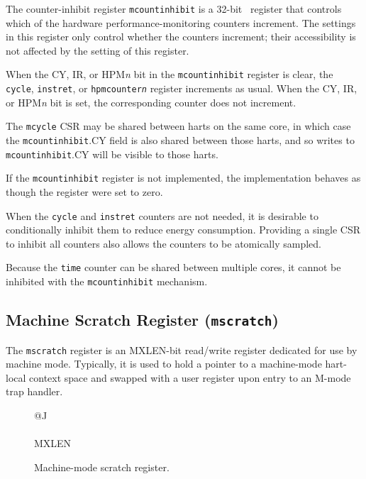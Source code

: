 The counter-inhibit register {\tt mcountinhibit} is a 32-bit \warl\ register
that controls which of the hardware performance-monitoring counters increment.
The settings in this register only control whether the counters increment;
their accessibility is not affected by the setting of this register.

When the CY, IR, or HPM{\em n} bit in the {\tt mcountinhibit} register is
clear, the {\tt cycle}, {\tt instret}, or {\tt hpmcounter{\em n}} register
increments as usual.  When the CY, IR, or HPM{\em n} bit is set, the
corresponding counter does not increment.

The {\tt mcycle} CSR may be shared between harts on the same core, in which
case the {\tt mcountinhibit}.CY field is also shared between those harts,
and so writes to {\tt mcountinhibit}.CY will be visible to those harts.

If the {\tt mcountinhibit} register is not implemented, the implementation
behaves as though the register were set to zero.

\begin{commentary}
When the {\tt cycle} and {\tt instret} counters are not needed, it is
desirable to conditionally inhibit them to reduce energy consumption.
Providing a single CSR to inhibit all counters also allows the counters to be
atomically sampled.

Because the {\tt time} counter can be shared between multiple cores, it
cannot be inhibited with the {\tt mcountinhibit} mechanism.
\end{commentary}

\subsection{Machine Scratch Register ({\tt mscratch})}

The {\tt mscratch} register is an MXLEN-bit read/write register
dedicated for use by machine mode.  Typically, it is used to hold a
pointer to a machine-mode hart-local context space and swapped with a
user register upon entry to an M-mode trap handler.

\begin{figure}[h!]
{\footnotesize
\begin{center}
\begin{tabular}{@{}J}
 \\
\hline
{} \\
\hline
MXLEN \\
\end{tabular}
\end{center}
}
\vspace{-0.1in}
\caption{Machine-mode scratch register.}
\label{mscratchreg}
\end{figure}

